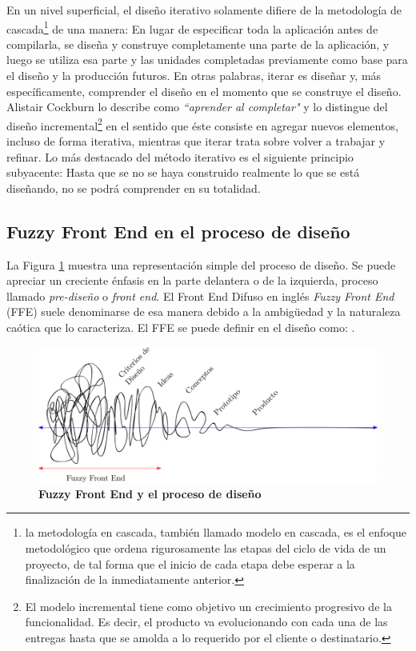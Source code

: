 En un nivel superficial, el diseño iterativo solamente difiere de la metodología de cascada\footnote{la metodología en cascada, también llamado modelo en cascada, es el enfoque metodológico que ordena rigurosamente las etapas del ciclo de vida de un proyecto, de tal forma que el inicio de cada etapa debe esperar a la finalización de la inmediatamente anterior.} de una manera: En lugar de especificar toda la aplicación antes de compilarla, se diseña y construye completamente una parte de la aplicación, y luego se utiliza esa parte y las unidades completadas previamente como base para el diseño y la producción futuros. En otras palabras, iterar es diseñar y, más específicamente, comprender el diseño en el momento que se construye el diseño. Alistair Cockburn lo describe como \textit{``aprender al completar"} y lo distingue del diseño incremental\footnote{El modelo incremental tiene como objetivo un crecimiento progresivo de la funcionalidad. Es decir, el producto va evolucionando con cada una de las entregas hasta que se amolda a lo requerido por el cliente o destinatario.
} en el sentido que éste consiste en agregar nuevos elementos, incluso de forma iterativa, mientras que iterar trata sobre volver a trabajar y refinar. Lo más destacado del método iterativo es el siguiente principio subyacente: Hasta que se no se haya construido realmente lo que se está diseñando, no se podrá comprender en su totalidad.\citep{Chronicles2009}

\subsection{Fuzzy Front End en el proceso de diseño}
La Figura \ref{fig:fuzzy1} muestra una representación simple del proceso de diseño. Se puede apreciar un creciente énfasis en la parte delantera o de la izquierda, proceso llamado \textit{pre-diseño} o \textit{front end}.
El Front End Difuso en inglés  \textit{Fuzzy Front End} (FFE) suele denominarse de esa manera debido a la ambigüedad y la naturaleza caótica que lo caracteriza. El FFE se puede definir en el diseño como:  \citep{schreiner}.

\begin{figure}
\centering
\includegraphics[width=14cm]{Img/CPD/cpd-fuzzy.png}
\caption{\textbf{\footnotesize{Fuzzy Front End y el proceso de diseño}}}
\label{fig:fuzzy1}
\end{figure}

